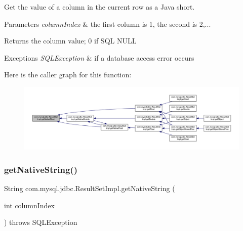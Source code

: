 Get the value of a column in the current row as a Java short.


\begin{DoxyParams}{Parameters}
{\em column\+Index} & the first column is 1, the second is 2,...\\
\hline
\end{DoxyParams}
\begin{DoxyReturn}{Returns}
the column value; 0 if S\+QL N\+U\+LL
\end{DoxyReturn}

\begin{DoxyExceptions}{Exceptions}
{\em S\+Q\+L\+Exception} & if a database access error occurs \\
\hline
\end{DoxyExceptions}
Here is the caller graph for this function\+:
\nopagebreak
\begin{figure}[H]
\begin{center}
\leavevmode
\includegraphics[width=350pt]{classcom_1_1mysql_1_1jdbc_1_1_result_set_impl_a0825e2c600b9bdc3bd1748a7c4f182f7_icgraph}
\end{center}
\end{figure}
\mbox{\label{classcom_1_1mysql_1_1jdbc_1_1_result_set_impl_aa58d90e37ce9380803aa9b3bac02ffa2}} 
\subsubsection{\texorpdfstring{get\+Native\+String()}{getNativeString()}}
{\footnotesize\ttfamily String com.\+mysql.\+jdbc.\+Result\+Set\+Impl.\+get\+Native\+String (\begin{DoxyParamCaption}\item[{int}]{column\+Index }\end{DoxyParamCaption}) throws S\+Q\+L\+Exception\hspace{0.3cm}{\ttfamily [protected]}}

